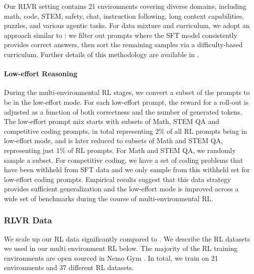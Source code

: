 Our RLVR setting contains 21 environments covering diverse domains, including math, code, STEM, safety, chat, instruction following, long context capabilities, puzzles, and various agentic tasks. For data mixture and curriculum, we adopt an approach similar to \nanomodel: we filter out prompts where the SFT model consistently provides correct answers, then sort the remaining samples via a difficulty-based curriculum. Further details of this methodology are available in \nanomodel.

\paragraph{Low-effort Reasoning}
During the multi-environmental RL stages, we convert a subset of the prompts to be in the low-effort mode. For each low-effort prompt, the reward for a roll-out is adjusted as a function of both correctness and the number of generated tokens. The low-effort prompt mix starts with subsets of Math, STEM QA and competitive coding prompts, in total representing 2\% of all RL prompts being in low-effort mode, and is later reduced to subsets of Math and STEM QA, representing just 1\% of RL prompts. For Math and STEM QA, we randomly sample a subset. For competitive coding, we have a set of coding problems that have been withheld from SFT data and we only sample from this withheld set for low-effort coding prompts. Empirical results suggest that this data strategy provides sufficient generalization and the low-effort mode is improved across a wide set of benchmarks during the course of multi-environmental RL.


\subsubsection*{RLVR Data}
We scale up our RL data significantly compared to \nanomodel. We describe the RL datasets we used in our multi environment RL below. The majority of the RL training environments are open sourced in Nemo Gym \citep{nemo-gym}. In total, we train on 21 environments and 37 different RL datasets.

